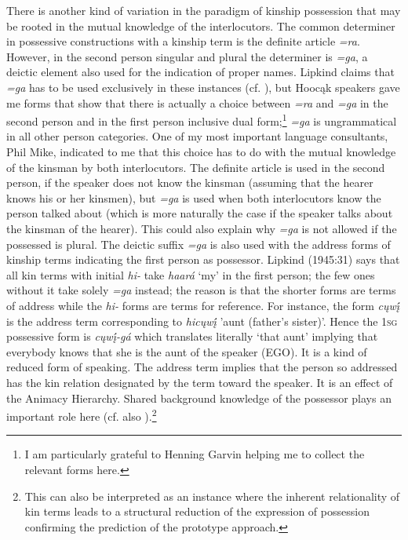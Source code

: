 \documentclass[output=paper]{LSP/langsci}
\begin{document}
There is another kind of variation in the paradigm of kinship possession that may be rooted in the mutual knowledge of the interlocutors. The common determiner in possessive constructions with a kinship term is the definite article \textit{=ra}. However, in the second person singular and plural the determiner is \textit{=ga}, a deictic element also used for the indication of proper names. Lipkind claims that \textit{=ga} has to be used exclusively in these instances (cf. \citealt[31]{Lipkind1945}), but Hoocąk speakers gave me forms that show that there is actually a choice between \textit{=ra} and \textit{=ga} in the second person and in the first person inclusive dual form;\footnote{I am particularly grateful to Henning Garvin helping me to collect the relevant forms here.} \textit{=ga} is ungrammatical in all other person categories. One of my most important language consultants, Phil Mike, indicated to me that this choice has to do with the mutual knowledge of the kinsman by both interlocutors. The definite article is used in the second person, if the speaker does not know the kinsman (assuming that the hearer knows his or her kinsmen), but \textit{=ga} is used when both interlocutors know the person talked about (which is more naturally the case if the speaker talks about the kinsman of the hearer). This could also explain why \textit{=ga} is not allowed if the possessed is plural. The deictic suffix \textit{=ga} is also used with the address forms of kinship terms indicating the first person as possessor. Lipkind (1945:31) says that all kin terms with initial \textit{hi-} take \textit{haará} `my' in the first person; the few ones without it take solely \textit{=ga} instead; the reason is that the shorter forms are terms of address while the \textit{hi-} forms are terms for reference. For instance, the form \textit{cųwį́} is the address term corresponding to \textit{hicųwį́} 'aunt (father's sister)'. Hence the \textsc{1sg} possessive form is \textit{cųwį́-gá} which translates literally `that aunt' implying that everybody knows that she is the aunt of the speaker (EGO). It is a kind of reduced form of speaking. The address term implies that the person so addressed has the kin relation designated by the term toward the speaker. It is an effect of the Animacy Hierarchy. Shared background knowledge of the possessor plays an important role here (cf. also \citealt[26f]{Heine1997}).\footnote{This can also be interpreted as an instance where the inherent relationality of kin terms leads to a structural reduction of the expression of possession confirming the prediction of the prototype approach.}
\end{document}
